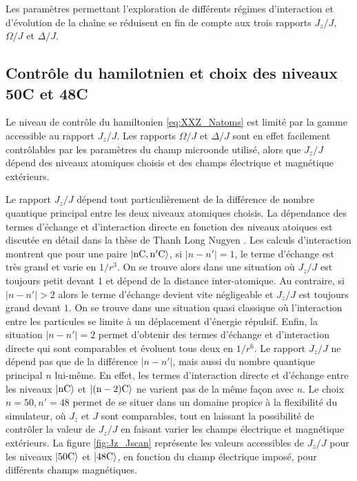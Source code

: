 Les paramètres permettant l'exploration de différents régimes d'interaction et d'évolution de la chaîne se réduisent en fin de compte aux trois rapports $J_z/J$, $\Omega/J$ et $\Delta/J$.

	\subsection{Contrôle du hamilotnien et choix des niveaux 50C et 48C}
\noindent Le niveau de contrôle du hamiltonien \eqref{eq:XXZ_Natoms} est limité par la gamme accessible au rapport $J_z/J$.
Les rapports $\Omega/J$ et $\Delta/J$ sont en effet facilement contrôlables par les paramètres du champ microonde utilisé, alors que $J_z/J$ dépend des niveaux atomiques choisis et des champs électrique et magnétique extérieurs.

Le rapport $J_z/J$ dépend tout particulièrement de la différence de nombre quantique principal entre les deux niveaux atomiques choisis.
La dépendance des termes d'échange et d'interaction directe en fonction des niveaux atoiques est discutée en détail dans la thèse de Thanh Long Nugyen \cite{PHD_NGUYEN}.
Les calculs d'interaction montrent que pour une paire $\ket{\mathrm{nC},\mathrm{n'C}}$, si $|n-n'|=1$, le terme d'échange est très grand et varie en $1/r^3$.
On se trouve alors dans une situation où $J_z/J$ est toujours petit devant $1$ et dépend de la distance inter-atomique.
Au contraire, si $|n-n'|>2$ alors le terme d'échange devient vite négligeable et $J_z/J$ est toujours grand devant $1$.
On se trouve dans une situation quasi classique où l'interaction entre les particules se limite à un déplacement d'énergie répulsif.
Enfin, la situation $|n-n'|=2$ permet d'obtenir des termes d'échange et d'interaction directe qui sont comparables et évoluent tous deux en $1/r^6$.
Le rapport $J_z/J$ ne dépend pas que de la différence $|n-n'|$, mais aussi du nombre quantique principal $n$ lui-même.
En effet, les termes d'interaction directe et d'échange entre les niveaux $\ket{\mathrm{nC}}$ et $\ket{\mathrm{(n-2)C}}$ ne varient pas de la même façon avec $n$.
Le choix $n=50,n'=48$ permet de se situer dans un domaine propice à la flexibilité du simulateur, où $J_z$ et $J$ sont comparables, tout en laissant la possibilité de contrôler la valeur de $J_z/J$ en faisant varier les champs électrique et magnétique extérieurs.
La figure \eqref{fig:Jz_Jscan} représente les valeurs accessibles de $J_z/J$ pour les niveaux $\ket{\mathrm{50C}}$ et $\ket{\mathrm{48C}}$, en fonction du champ électrique imposé, pour différents champs magnétiques.
